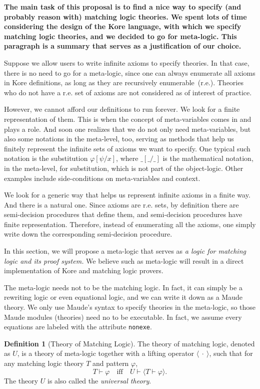 \documentclass[UTF8]{article}
\newcommand{\comment}[1]
    {\par {\bfseries \color{blue} #1 \par}} %
\newcounter{thmcounter}
\theoremstyle{plain}
\theoremstyle{definition}
\newtheorem{definition}[thmcounter]{Definition}
\theoremstyle{remark}
\begin{document}
\comment{
The main task of this proposal is to find a nice way to specify (and probably reason with) matching logic theories. We spent lots of time considering the design of the Kore language, with which we specify matching logic theories, and we decided to go for meta-logic. This paragraph is a summary that serves as a justification of our choice. 

Suppose we allow users to write infinite axioms to specify theories. In that case, there is no need to go for a meta-logic, since one can always enumerate all axioms in Kore definitions, as long as they are recursively enumerable~(r.e.). Theories who do not have a r.e. set of axioms are not considered as of interest of practice. 

However, we cannot afford our definitions to run forever. We look for a finite representation of them. This is when the concept of meta-variables comes in and plays a role. And soon one realizes that we do not only need meta-variables, but also some notations in the meta-level, too, serving as methods that help us finitely represent the infinite sets of axioms we want to specify. One typical such notation is the substitution $\varphi[\psi/x]$, where $\_[\_/\_]$ is the mathematical notation, in the meta-level, for substitution, which is not part of the object-logic. Other examples include side-conditions on meta-variables and context.

We look for a generic way that helps us represent infinite axioms in a finite way. And there is a natural one. Since axioms are r.e. sets, by definition there are semi-decision procedures that define them, and semi-decision procedures have finite representation. Therefore, instead of enumerating all the axioms, one simply write down the corresponding semi-decision procedure. 

In this section, we will propose a meta-logic that serves as \emph{a logic for 
matching logic and its proof system.} We believe such as meta-logic will result 
in a direct implementation of Kore and matching logic provers. 

The meta-logic needs not to be the matching logic. In fact, it can simply be a 
rewriting logic or even equational logic, and we can write it down as a Maude 
theory. We only use Maude's syntax to specify theories in the meta-logic, so 
those Maude modules (theories) need no to be executable. In fact, we assume 
every equations are labeled with the attribute \texttt{nonexe}.

\begin{definition}[Theory of Matching Logic]
	The theory of matching logic, denoted as $U$, is a theory of meta-logic together with a lifting operator $\langle \ \cdot \ \rangle$, such that for any matching logic theory $T$ and pattern $\varphi$, 
	\begin{equation*}
	T \vdash \varphi \quad \text{iff} \quad U \vdash \langle T \vdash \varphi \rangle.
	\end{equation*}
	The theory $U$ is also called the \emph{universal theory}. 
\end{definition}



}
\end{document}
